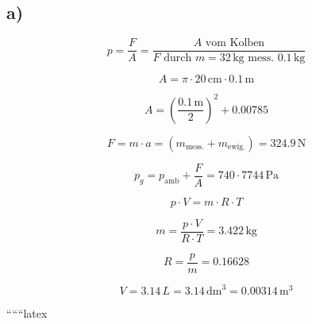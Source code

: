 

\subsection*{a)}

\[
p = \frac{F}{A} = \frac{A \text{ vom Kolben}}{F \text{ durch } m = 32 \, \text{kg} \text{ mess. } 0.1 \, \text{kg}}
\]

\[
A = \pi \cdot 20 \, \text{cm} \cdot 0.1 \, \text{m}
\]

\[
A = \left( \frac{0.1 \, \text{m}}{2} \right)^2 + 0.00785
\]

\[
F = m \cdot a = (m_{\text{mess.}} + m_{\text{ewig.}}) = 324.9 \, \text{N}
\]

\[
p_g = p_{\text{amb}} + \frac{F}{A} = 740 \cdot 7744 \, \text{Pa}
\]

\[
p \cdot V = m \cdot R \cdot T
\]

\[
m = \frac{p \cdot V}{R \cdot T} = 3.422 \, \text{kg}
\]

\[
R = \frac{p}{m} = 0.16628
\]

\[
V = 3.14 \, L = 3.14 \, \text{dm}^3 = 0.00314 \, \text{m}^3
\]

``````latex
